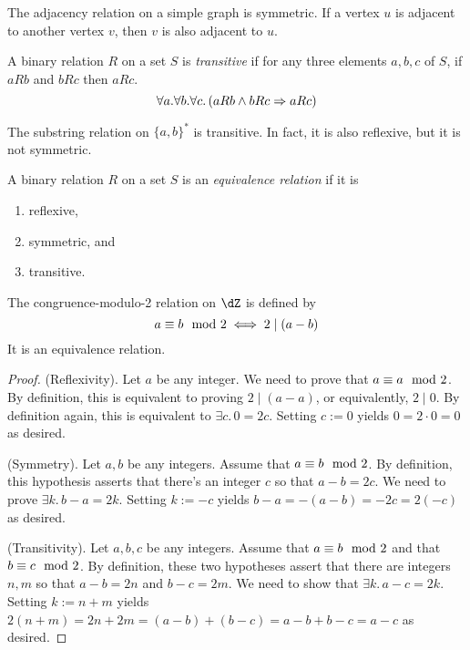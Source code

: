 \documentclass{amsart}
\begin{document}
\begin{eg}
  The adjacency relation on a simple graph is symmetric.
  If a vertex $u$ is adjacent to another vertex $v$, then $v$ is also adjacent to $u$.
\end{eg}

\begin{defn}[Transitivity]
  A binary relation $R$ on a set $S$ is \emph{transitive} if for any three elements $a,b,c$ of $S$, if $aRb$ and $bRc$ then $aRc$.
  \[
    \forall a.\forall b.\forall c.\,(aRb \wedge bRc \Rightarrow aRc)
  \]
\end{defn}

\begin{eg}
  The substring relation on $\{a,b\}^{*}$ is transitive.
  In fact, it is also reflexive, but it is not symmetric.
\end{eg}

\begin{defn}
  A binary relation $R$ on a set $S$ is an \emph{equivalence relation} if it is
  \begin{enumerate}
  \item reflexive,
  \item symmetric, and
  \item transitive.
  \end{enumerate}
\end{defn}

\begin{prop}\label{prop:cng-mod-equiv}
  The congruence-modulo-2 relation on $\dZ$ is defined by
  \[
    a \equiv b \mod{2} \iff 2 \mid (a - b)
  \]
  It is an equivalence relation.
\end{prop}
\begin{proof}
  (Reflexivity). Let $a$ be any integer.
  We need to prove that $a \equiv a \mod{2}$.
  By definition, this is equivalent to proving $2 \mid (a - a)$, or equivalently, $2 \mid 0$.
  By definition again, this is equivalent to $\exists c.\,0 = 2c$.
  Setting $c := 0$ yields $0 = 2 \cdot 0 = 0$ as desired.

  (Symmetry). Let $a, b$ be any integers.
  Assume that $a \equiv b \mod{2}$.
  By definition, this hypothesis asserts that there's an integer $c$ so that $a - b = 2c$.
  We need to prove $\exists k.\,b - a = 2k$.
  Setting $k := -c$ yields $b - a = -(a - b) = -2c = 2(-c)$ as desired.

  (Transitivity). Let $a, b, c$ be any integers.
  Assume that $a \equiv b \mod{2}$ and that $b \equiv c \mod{2}$.
  By definition, these two hypotheses assert that there are integers $n, m$ so that $a - b = 2n$ and $b - c = 2m$.
  We need to show that $\exists k.\,a - c = 2k$.
  Setting $k := n + m$ yields $2(n + m) = 2n + 2m = (a - b) + (b - c) = a - b + b - c = a - c$ as desired.
\end{proof}
\end{document}
